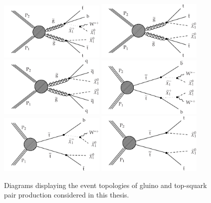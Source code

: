 \begin{figure}[thb!]
\includegraphics[width=0.45\textwidth]{figs/theory/T1tttb.pdf}
\includegraphics[width=0.45\textwidth]{figs/theory/T1tttt.pdf} \\
\includegraphics[width=0.45\textwidth]{figs/theory/T1qqqq.pdf} 
\includegraphics[width=0.45\textwidth]{figs/theory/T2bw.pdf} \\
\includegraphics[width=0.45\textwidth]{figs/theory/T2tb.pdf}
\includegraphics[width=0.45\textwidth]{figs/theory/T2tt.pdf}
\caption{Diagrams displaying the event topologies of gluino and top-squark pair production
  considered in this thesis.\label{fig:SMSDiagrams}}
\end{figure}

